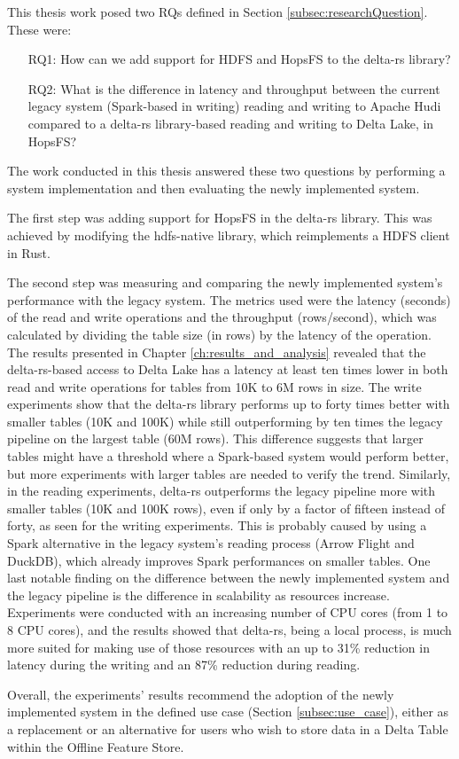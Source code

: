 This thesis work posed two \glspl{RQ} defined in Section \ref{subsec:researchQuestion}. These were: 
\begin{enumerate}
    \item[RQ1:] How can we add support for \gls{HDFS} and \gls{HopsFS} to the delta-rs library?
    \item[RQ2:] What is the difference in latency and throughput between the current legacy system (Spark-based in writing) reading and writing to Apache Hudi compared to a delta-rs library-based reading and writing to Delta Lake, in \gls{HopsFS}?
\end{enumerate}
The work conducted in this thesis answered these two questions by performing a system implementation and then evaluating the newly implemented system. 

The first step was adding support for \gls{HopsFS} in the delta-rs library. This was achieved by modifying the hdfs-native \cite{binfordKimahrimanHdfsnative2024} library, which reimplements a \gls{HDFS} client in Rust. 

The second step was measuring and comparing the newly implemented system's performance with the legacy system. The metrics used were the latency (seconds) of the read and write operations and the throughput (rows/second), which was calculated by dividing the table size (in rows) by the latency of the operation. The results presented in Chapter \ref{ch:results_and_analysis} revealed that the delta-rs-based access to Delta Lake has a latency at least ten times lower in both read and write operations for tables from 10K to 6M rows in size. The write experiments show that the delta-rs library performs up to forty times better with smaller tables (10K and 100K) while still outperforming by ten times the legacy pipeline on the largest table (60M rows). This difference suggests that larger tables might have a threshold where a Spark-based system would perform better, but more experiments with larger tables are needed to verify the trend.
Similarly, in the reading experiments, delta-rs outperforms the legacy pipeline more with smaller tables (10K and 100K rows), even if only by a factor of fifteen instead of forty, as seen for the writing experiments. This is probably caused by using a Spark alternative in the legacy system's reading process (Arrow Flight and DuckDB), which already improves Spark performances on smaller tables. One last notable finding on the difference between the newly implemented system and the legacy pipeline is the difference in scalability as resources increase. Experiments were conducted with an increasing number of \gls{CPU} cores (from 1 to 8 \gls{CPU} cores), and the results showed that delta-rs, being a local process, is much more suited for making use of those resources with an up to 31\% reduction in latency during the writing and an 87\% reduction during reading.

Overall, the experiments' results recommend the adoption of the newly implemented system in the defined use case (Section \ref{subsec:use_case}), either as a replacement or an alternative for users who wish to store data in a Delta Table within the Offline Feature Store.
